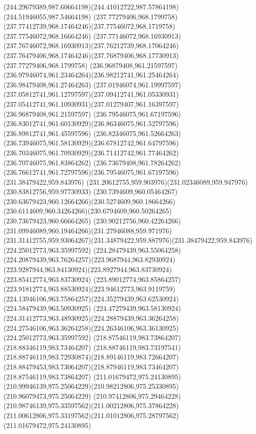 {{\curveto(244.29679389,987.60664198)(244.41012722,987.57864198)(244.51946055,987.54664198)
\moveto(237.77279406,968.1799758)
\curveto(237.77412739,968.17464246)(237.77546072,968.1719758)(237.77546072,968.16664246)
\curveto(237.77146072,968.16930913)(237.76746072,968.16930913)(237.76212739,968.17064246)
\curveto(237.76479406,968.17464246)(237.76879406,968.17730913)(237.77279406,968.1799758)
\moveto(236.96879408,961.21597597)
\curveto(236.97946074,961.23464264)(236.98212741,961.25464264)(236.98479408,961.27464263)
\curveto(237.01946074,961.19997597)(237.05812741,961.12797597)(237.09412741,961.05330931)
\curveto(237.05412741,961.10930931)(237.01279407,961.16397597)(236.96879408,961.21597597)
\moveto(236.79546075,961.67197596)
\curveto(236.83012741,961.60130929)(236.86346075,961.52797596)(236.89812741,961.45597596)
\curveto(236.82346075,961.52664263)(236.73946075,961.58130929)(236.67812742,961.64797596)
\curveto(236.70346075,961.70930929)(236.71412742,961.77464262)(236.70746075,961.83864262)
\curveto(236.73679408,961.78264262)(236.76612741,961.72797596)(236.79546075,961.67197596)
\moveto(231.38479422,959.843976)
\curveto(231.20612755,959.903976)(231.02346089,959.947976)(230.83812756,959.97730933)
\curveto(230.7394609,960.05464267)(230.63679423,960.12664266)(230.5274609,960.18664266)
\curveto(230.6114609,960.34264266)(230.6794609,960.50264265)(230.73679423,960.66664265)
\curveto(230.90212756,960.42264266)(231.09946089,960.19464266)(231.27946088,959.971976)
\curveto(231.31412755,959.93064267)(231.34879422,959.887976)(231.38479422,959.843976)
\moveto(224.25012773,963.35997592)
\curveto(224.28479439,963.55064258)(224.20879439,963.76264257)(223.9687944,963.82930924)
\curveto(223.9287944,963.84130924)(223.8927944,963.83730924)(223.85412774,963.83730924)
\curveto(223.89012774,963.85864257)(223.91812774,963.88530924)(223.94612773,963.9119759)
\curveto(224.13946106,963.75864257)(224.35279439,963.62530924)(224.58479439,963.50930925)
\curveto(224.47279439,963.58130924)(224.31412773,963.48930925)(224.28879439,963.36264258)
\curveto(224.27546106,963.36264258)(224.26346106,963.36130925)(224.25012773,963.35997592)
\moveto(218.87546119,983.73864207)
\lineto(218.88346119,983.73464207)
\curveto(218.88746119,983.73197541)(218.88746119,983.72930874)(218.89146119,983.72664207)
\curveto(218.88479453,983.73064207)(218.87946119,983.73464207)(218.87546119,983.73864207)
\moveto(211.01679472,975.24130895)
\curveto(210.99946139,975.25064229)(210.98212806,975.25330895)(210.96079473,975.25064229)
\curveto(210.97412806,975.29464228)(210.98746139,975.33597562)(211.00212806,975.37864228)
\curveto(211.00612806,975.33197562)(211.01012806,975.28797562)(211.01679472,975.24130895)
}}
